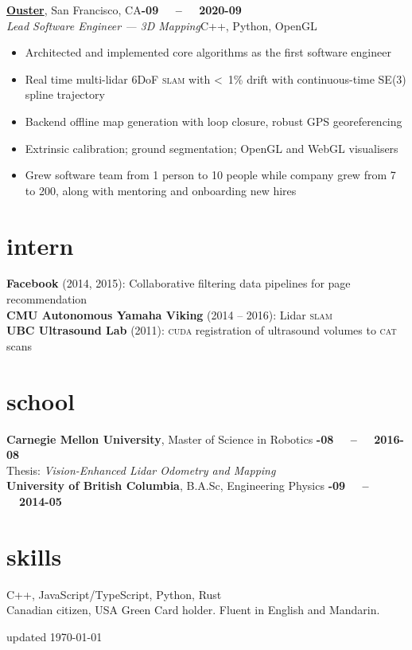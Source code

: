 \documentclass[margin,10pt]{res}
\begin{document}
\begin{resume}
    \href{https://ouster.com}{\textbf{Ouster}}, San Francisco, CA\hfill \textsc{\bfseries{}-09~~ -- ~~2020-09}\\
    \textit{Lead Software Engineer --- 3D Mapping}\hfill C++, Python, OpenGL
    \vspace{0.5em}
    \begin{itemize}
        \item Architected and implemented core algorithms as the first software engineer
        \item Real time multi-lidar 6DoF \textsc{slam} with <~1\% drift with continuous-time SE(3) spline trajectory
        \item Backend offline map generation with loop closure, robust GPS georeferencing
        \item Extrinsic calibration; ground segmentation; OpenGL and WebGL visualisers
        \item Grew software team from 1 person to 10 people while company grew from 7 to 200, along with mentoring and onboarding new hires
    \end{itemize}
\section{\sc \lsstyle intern}
    \textbf{Facebook} (2014, 2015): Collaborative filtering data pipelines for page recommendation\\
    \textbf{CMU Autonomous Yamaha Viking} (2014 -- 2016): Lidar \textsc{slam} \\
    \textbf{UBC Ultrasound Lab} (2011): \textsc{cuda} registration of ultrasound volumes to \textsc{cat} scans
\section{\sc \lsstyle school}
    \textbf{Carnegie Mellon University}, Master of Science in Robotics \hfill \textsc{\bfseries{}-08~~ -- ~~2016-08}\\
    Thesis: \textit{Vision-Enhanced Lidar Odometry and Mapping}\vspace{3pt}\\
    \textbf{University of British Columbia}, B.A.Sc, Engineering Physics \hfill \textsc{\bfseries{}-09~~ -- ~~2014-05}\\
\section{\sc \lsstyle skills}
    C++, JavaScript/TypeScript, Python, Rust \\
    Canadian citizen, USA Green Card holder. Fluent in English and Mandarin.\\
\end{resume}
\begin{minipage}[t]{\textwidth}
    \flushright
    \small
    \sc \lsstyle
    \hfill updated \today
\end{minipage}
\end{document}
